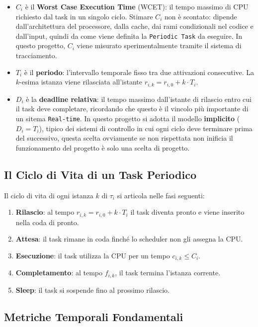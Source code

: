 \begin{itemize}
	\item $C_i$ è il \textbf{Worst Case Execution Time} (WCET): il tempo massimo di CPU richiesto dal task in un singolo ciclo. Stimare $C_i$ non è scontato: dipende dall'architettura del processore, dalla cache, dai rami condizionali nel codice e dall'input, quindi da come viene definita la \texttt{Periodic Task} da eseguire. In questo progetto, $C_i$ viene misurato sperimentalmente tramite il sistema di tracciamento.
	\item $T_i$ è il \textbf{periodo}: l'intervallo temporale fisso tra due attivazioni consecutive. La $k$-esima istanza viene rilasciata all'istante $r_{i,k} = r_{i,0} + k \cdot T_i$.
	\item $D_i$ è la \textbf{deadline relativa}: il tempo massimo dall'istante di rilascio entro cui il task deve completare, ricordando che questo è il vincolo più importante di un sitema \texttt{Real-time}. In questo progetto si adotta il modello \textbf{implicito} ($D_i = T_i$), tipico dei sistemi di controllo in cui ogni ciclo deve terminare prima del successivo, questa scelta ovviamente se non rispettata non inificia il funzionamento del progetto è solo una scelta di progetto.
\end{itemize}

\subsection{Il Ciclo di Vita di un Task Periodico}

Il ciclo di vita di ogni istanza $k$ di $\tau_i$ si articola nelle fasi seguenti:

\begin{enumerate}
	\item \textbf{Rilascio}: al tempo $r_{i,k} = r_{i,0} + k \cdot T_i$ il task diventa pronto e viene inserito nella coda di pronto.
	\item \textbf{Attesa}: il task rimane in coda finché lo scheduler non gli assegna la CPU.
	\item \textbf{Esecuzione}: il task utilizza la CPU per un tempo $c_{i,k} \leq C_i$.
	\item \textbf{Completamento}: al tempo $f_{i,k}$, il task termina l'istanza corrente.
	\item \textbf{Sleep}: il task si sospende fino al prossimo rilascio.
\end{enumerate}

\subsection{Metriche Temporali Fondamentali}


